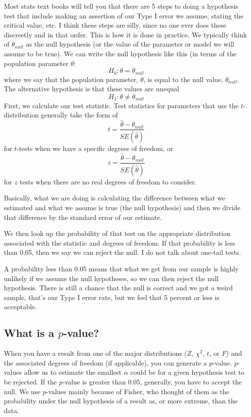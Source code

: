 Most stats text books will tell you that there are 5 steps to doing a hypothesis test that include making an assertion of our Type I error we assume, stating the critical value, etc. I think these steps are silly, since no one ever does these discreetly and in that order. This is how it is done in practice.
We typically think of $\theta_{null}$ as the null hypothesis (or the value of the parameter or model we will assume to be true). We can write the null hypothesis like this (in terms of the population parameter $\theta$:
\[
H_0:\theta=\theta_{null}
\]
where we say that the population parameter, $\theta$, is equal to the null value, $\theta_{null}$.
The alternative hypothesis is that these values are unequal
\[
H_1:\theta\ne\theta_{null}
\]
First, we calculate our test statistic. Test statistics for parameters that use the $t$-distribution generally take the form of
\begin{equation}
t = \frac{\hat{\theta}-\theta_{null}}{SE\left(\hat{\theta}\right)}
\end{equation}\label{eq:ttest}
for $t$-tests when we have a specific degrees of freedom, or
\begin{equation}\label{eq:ztest}
z = \frac{\hat{\theta}-\theta_{null}}{SE\left(\hat{\theta}\right)}
\end{equation}
for $z$ tests when there are no real degrees of freedom to consider.

Basically, what we are doing is calculating the difference between what we estimated and what we assume is true (the null hypothesis) and then we divide that difference by the standard error of our estimate.

We then look up the probability of that test on the appropriate distribution associated with the statistic and degrees of freedom. If that probability is less than 0.05, then we say we can reject the null. I do not talk about one-tail tests.

A probability less than 0.05 means that what we get from our sample is highly unlikely if we assume the null hypotheses, so we can then reject the null hypothesis. There is still a chance that the null is correct and we got a weird sample, that's our Type I error rate, but we feel that 5 percent or less is acceptable.

\subsection{What is a $p$-value?}

When you have a result from one of the major distributions ($Z$, $\chi^2$, $t$, or $F$) and the associated degrees of freedom (if applicable), you can generate a $p$-value. $p$-values allow us to estimate the smallest $\alpha$ could be for a given hypothesis test to be rejected. If the $p$-value is greater than 0.05, generally, you have to accept the null. We use $p$-values mainly because of Fisher, who thought of them as the probability under the null hypothesis of a result as, or more extreme, than the data.

